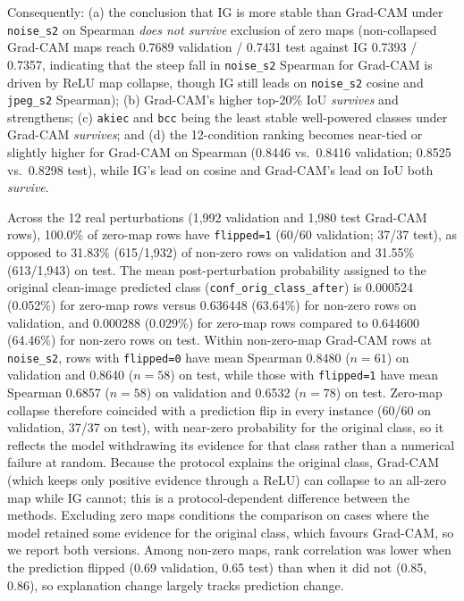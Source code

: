 \documentclass[conference]{IEEEtran}
\begin{document}
Consequently: (a) the conclusion that IG is more stable than Grad-CAM under
\texttt{noise\_s2} on Spearman \emph{does not survive} exclusion of zero maps
(non-collapsed Grad-CAM maps reach 0.7689 validation / 0.7431 test against
IG 0.7393 / 0.7357, indicating that the steep fall in \texttt{noise\_s2}
Spearman for Grad-CAM is driven by ReLU map collapse, though IG still leads
on \texttt{noise\_s2} cosine and \texttt{jpeg\_s2} Spearman); (b)
Grad-CAM's higher top-20\% IoU \emph{survives} and strengthens; (c)
\texttt{akiec} and \texttt{bcc} being the least stable well-powered classes
under Grad-CAM \emph{survives}; and (d) the 12-condition ranking becomes
near-tied or slightly higher for Grad-CAM on Spearman (0.8446 vs.\ 0.8416
validation; 0.8525 vs.\ 0.8298 test), while IG's lead on cosine and
Grad-CAM's lead on IoU both \emph{survive}.

Across the 12 real perturbations (1,992 validation and 1,980 test
Grad-CAM rows), 100.0\% of zero-map rows have \texttt{flipped=1} (60/60
validation; 37/37 test), as opposed to 31.83\% (615/1,932) of non-zero
rows on validation and 31.55\% (613/1,943) on test. The mean
post-perturbation probability assigned to the original clean-image predicted
class (\texttt{conf\_orig\_class\_after}) is 0.000524 (0.052\%) for zero-map
rows versus 0.636448 (63.64\%) for non-zero rows on validation, and 0.000288
(0.029\%) for zero-map rows compared to 0.644600 (64.46\%) for non-zero rows on
test. Within non-zero-map Grad-CAM rows at \texttt{noise\_s2}, rows with
\texttt{flipped=0} have mean Spearman 0.8480 ($n{=}61$) on validation
and 0.8640 ($n{=}58$) on test, while those with \texttt{flipped=1} have
mean Spearman 0.6857 ($n{=}58$) on validation and 0.6532 ($n{=}78$) on test.
Zero-map collapse therefore coincided with a prediction flip in every instance
(60/60 on validation, 37/37 on test), with near-zero probability for the
original class, so it reflects the model withdrawing its evidence for that
class rather than a numerical failure at random. Because the protocol explains
the original class, Grad-CAM (which keeps only positive evidence through a
ReLU) can collapse to an all-zero map while IG cannot; this is a
protocol-dependent difference between the methods. Excluding zero maps
conditions the comparison on cases where the model retained some evidence
for the original class, which favours Grad-CAM, so we report both versions.
Among non-zero maps, rank correlation was lower when the prediction flipped
(0.69 validation, 0.65 test) than when it did not (0.85, 0.86), so
explanation change largely tracks prediction change.
\end{document}
